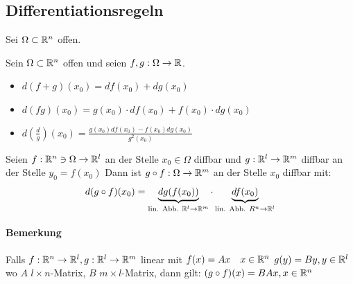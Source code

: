\documentclass[a4paper]{article}
\begin{document}
	\subsection{Differentiationsregeln}
		Sei $\Omega \subset \mathbb{R}^n$ offen.
		\begin{fsatz}[Differentiationsregeln in $\R^n$]
		Sein $\Omega \subset \mathbb{R}^n$ offen und seien $f,g: \Omega \rightarrow \mathbb{R}$.
			\begin{itemize}
			\item $d(f+g)(x_0) = df(x_0) + dg(x_0)$
			\item $d(fg)(x_0) = g(x_0) \cdot df(x_0)+f(x_0)\cdot dg(x_0)$
			\item $d(\frac{d}{g})(x_0) = \frac{g(x_0)df(x_0)-f(x_0)dg(x_0)}{g^2(x_0)}$
			\end{itemize}
		\end{fsatz}
		
% 	
		\begin{fsatz}[Kettenregel]
			Seien $f: \mathbb{R}^n \ni \Omega \rightarrow \mathbb{R}^l$ an der Stelle $x_0 \in \Omega$ diffbar und $g:\mathbb{R}^l \rightarrow \mathbb{R}^m$ diffbar an der Stelle $y_0 = f(x_0)$
			Dann ist $g \circ f: \Omega \rightarrow \mathbb{R}^m$ an der Stelle $x_0$ diffbar mit:
			$$d(g\circ f)(x_0) = \underbrace{dg(f(x_0))}_{\text{lin. Abb. }\mathbb{R}^l \rightarrow \mathbb{R}^m} \cdot \underbrace{df(x_0)}_{\text{lin. Abb. }R^n \rightarrow \mathbb{R}^l}$$
			
			
			\paragraph{Bemerkung} Falls $f: \mathbb{R}^n \rightarrow \mathbb{R}^l, g: \mathbb{R}^l \rightarrow \mathbb{R}^m$ linear mit $f(x)=Ax \quad x \in \mathbb{R}^n$ $g(y)= By, y \in \mathbb{R}^l$ wo $A$ $l \times n$-Matrix, $B$ $m \times l$-Matrix, dann gilt: $(g \circ f)(x) = BAx, x \in \mathbb{R}^n$
		\end{fsatz}
		
\end{document}
